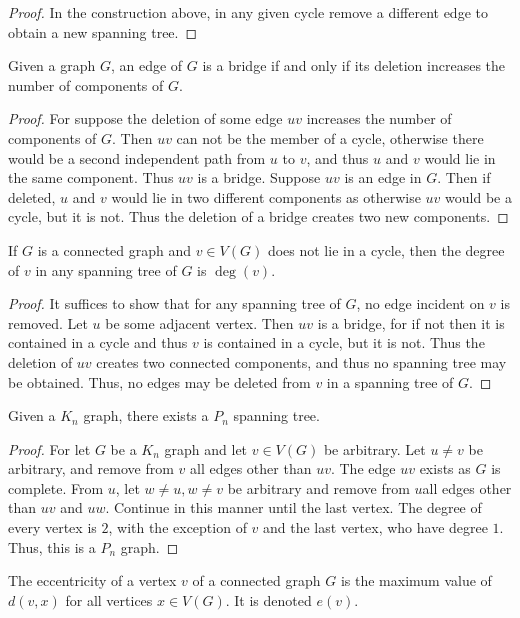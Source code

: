     \begin{proof}
    In the construction above, in any given cycle remove a different edge to obtain a new spanning tree.
    \end{proof}
    \begin{theorem}
    Given a graph $G$, an edge of $G$ is a bridge if and only if its deletion increases the number of components of $G$.
    \end{theorem}
    \begin{proof}
    For suppose the deletion of some edge $uv$ increases the number of components of $G$. Then $uv$ can not be the member of a cycle, otherwise there would be a second independent path from $u$ to $v$, and thus $u$ and $v$ would lie in the same component. Thus $uv$ is a bridge. Suppose $uv$ is an edge in $G$. Then if deleted, $u$ and $v$ would lie in two different components as otherwise $uv$ would be a cycle, but it is not. Thus the deletion of a bridge creates two new components.
    \end{proof}
    \begin{theorem}
    If $G$ is a connected graph and $v\in V(G)$ does not lie in a cycle, then the degree of $v$ in any spanning tree of $G$ is $\deg(v)$.
    \end{theorem}
    \begin{proof}
    It suffices to show that for any spanning tree of $G$, no edge incident on $v$ is removed. Let $u$ be some adjacent vertex. Then $uv$ is a bridge, for if not then it is contained in a cycle and thus $v$ is contained in a cycle, but it is not. Thus the deletion of $uv$ creates two connected components, and thus no spanning tree may be obtained. Thus, no edges may be deleted from $v$ in a spanning tree of $G$.
    \end{proof}
    \begin{theorem}
    Given a $K_n$ graph, there exists a $P_n$ spanning tree.
    \end{theorem}
    \begin{proof}
    For let $G$ be a $K_n$ graph and let $v\in V(G)$ be arbitrary. Let $u\ne v$ be arbitrary, and remove from $v$ all edges other than $uv$. The edge $uv$ exists as $G$ is complete. From $u$, let $w\ne u, w\ne v$ be arbitrary and remove from $u$all edges other than $uv$ and $uw$. Continue in this manner until the last vertex. The degree of every vertex is $2$, with the exception of $v$ and the last vertex, who have degree $1$. Thus, this is a $P_n$ graph.
    \end{proof}
    \begin{definition}
    The eccentricity of a vertex $v$ of a connected graph $G$ is the maximum value of $d(v,x)$ for all vertices $x\in V(G)$. It is denoted $e(v)$.
    \end{definition}

